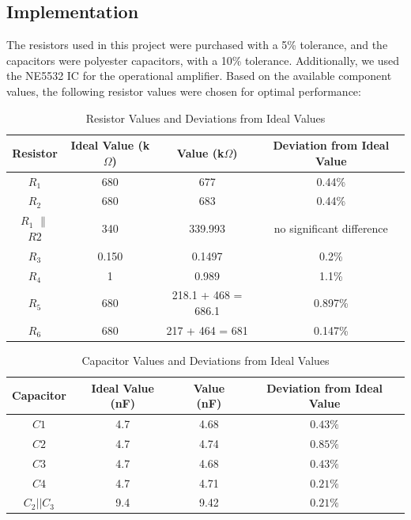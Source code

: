 \documentclass[hidelinks,12pt]{article}
\begin{document}
	\subsection{Implementation}	 \label{sec:implementation}
	The resistors used in this project were purchased with a 5\% tolerance, and the capacitors were polyester capacitors, with a 10\% tolerance. Additionally, we used the NE5532 IC for the operational amplifier. Based on the available component values, the following resistor values were chosen for optimal performance:
	\\
	\begin{table}[ht]
		\centering
		\begin{tabular}{|c|c|c|c|}
			\hline
			\textbf{Resistor} & \textbf{Ideal Value (k\(\Omega\))} & \textbf{Value (k\(\Omega\))} & \textbf{Deviation from Ideal Value} \\ \hline
			$R_1$ & 680 & 677 & 0.44\% \\ \hline
			$R_2$ & 680 & 683 & 0.44\% \\ \hline
			$R_1$ $\parallel$ $R2$ & 340 & 339.993 & no significant difference \\ \hline
			$R_3$ & 0.150 & 0.1497 & 0.2\% \\ \hline
			$R_4$ & 1 & 0.989 & 1.1\% \\ \hline
			$R_5$ & 680 & 218.1 + 468 = 686.1 & 0.897\% \\ \hline
			$R_6$ & 680 & 217 + 464 = 681 & 0.147\% \\ \hline
		\end{tabular}
		\caption{Resistor Values and Deviations from Ideal Values}
	\end{table}
	
	\begin{table}[ht]
		\centering
		\begin{tabular}{|c|c|c|c|}
			\hline
			\textbf{Capacitor} & \textbf{Ideal Value (nF)} & \textbf{Value (nF)} & \textbf{Deviation from Ideal Value} \\ \hline
			$C1$ & 4.7 & 4.68 & \(0.43\%\) \\ \hline
			$C2$ & 4.7 & 4.74 & \(0.85\%\) \\ \hline
			$C3$ & 4.7 & 4.68 & \(0.43\%\) \\ \hline
			$C4$ & 4.7 & 4.71 & \(0.21\%\) \\ \hline
			$C_2 || C_3$ & 9.4 & 9.42 & \(0.21\%\) \\ \hline
		\end{tabular}
		\caption{Capacitor Values and Deviations from Ideal Values}
	\end{table}
\end{document}
